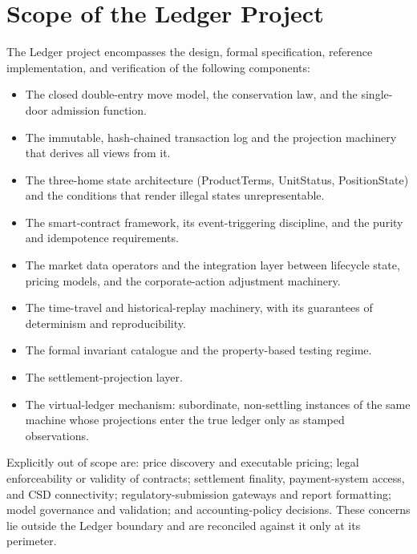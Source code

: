 \documentclass[11pt,a4paper]{article}
\newcommand{\clabel}[1]{\leavevmode\hypertarget{clause-#1}{}%
  \marginpar{\raggedright\scriptsize\ttfamily\textcolor{gray}{#1}}}
\providecommand{\tightlist}{\setlength{\itemsep}{2pt}\setlength{\parskip}{0pt}}
\begin{document}
\hypertarget{scope-of-the-ledger-project}{%
\section{Scope of the Ledger
Project}\label{scope-of-the-ledger-project}}

\clabel{C-Scope.1}The Ledger project encompasses the design, formal specification,
reference implementation, and verification of the following components:

\begin{itemize}
\tightlist
\item
  \clabel{C-Scope.2}The closed double-entry move model, the conservation law, and the
  single-door admission function.
\item
  \clabel{C-Scope.3}The immutable, hash-chained transaction log and the projection
  machinery that derives all views from it.
\item
  \clabel{C-Scope.4}The three-home state architecture (ProductTerms, UnitStatus,
  PositionState) and the conditions that render illegal states
  unrepresentable.
\item
  \clabel{C-Scope.5}The smart-contract framework, its event-triggering discipline, and the
  purity and idempotence requirements.
\item
  \clabel{C-Scope.6}The market data operators and the integration layer between lifecycle
  state, pricing models, and the corporate-action adjustment machinery.
\item
  \clabel{C-Scope.7}The time-travel and historical-replay machinery, with its guarantees
  of determinism and reproducibility.
\item
  \clabel{C-Scope.8}The formal invariant catalogue and the property-based testing regime.
\item
  \clabel{C-Scope.9}The settlement-projection layer.
\item
  \clabel{C-Scope.10}The virtual-ledger mechanism: subordinate, non-settling instances of
  the same machine whose projections enter the true ledger only as
  stamped observations.
\end{itemize}

\clabel{C-Scope.11}Explicitly out of scope are: price discovery and executable pricing;
legal enforceability or validity of contracts; settlement finality,
payment-system access, and CSD connectivity; regulatory-submission
gateways and report formatting; model governance and validation; and
accounting-policy decisions. These concerns lie outside the Ledger
boundary and are reconciled against it only at its perimeter.
\end{document}
